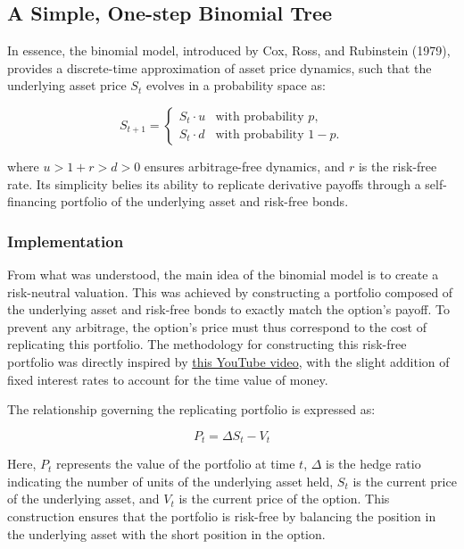 \documentclass{article}
\begin{document}
    \subsection{A Simple, One-step Binomial Tree}

    In essence, the binomial model, introduced by Cox, Ross, and Rubinstein (1979), provides a discrete-time approximation of asset price dynamics, such that the underlying asset price \( S_t \) evolves in a probability space as:

    \[
        S_{t+1} =
        \begin{cases}
            S_t \cdot u & \text{with probability } p, \\
            S_t \cdot d & \text{with probability } 1 - p.
        \end{cases}
    \]

    where \( u > 1 + r > d > 0 \) ensures arbitrage-free dynamics, and \( r \) is the risk-free rate. Its simplicity belies its ability to replicate derivative payoffs through a self-financing portfolio of the underlying asset and risk-free bonds.

    \subsubsection{Implementation}

    From what was understood, the main idea of the binomial model is to create a risk-neutral valuation. This was achieved by constructing a portfolio composed of the underlying asset and risk-free bonds to exactly match the option's payoff. To prevent any arbitrage, the option's price must thus correspond to the cost of replicating this portfolio. The methodology for constructing this risk-free portfolio was directly inspired by \href{https://www.youtube.com/watch?v=eA5AtTx3rRI}{this YouTube video}, with the slight addition of fixed interest rates to account for the time value of money.

    \medskip

    The relationship governing the replicating portfolio is expressed as:

    \[
        P_t = \Delta S_t - V_t
    \]

    Here, \( P_t \) represents the value of the portfolio at time \( t \), \( \Delta \) is the hedge ratio indicating the number of units of the underlying asset held, \( S_t \) is the current price of the underlying asset, and \( V_t \) is the current price of the option. This construction ensures that the portfolio is risk-free by balancing the position in the underlying asset with the short position in the option.
\end{document}
